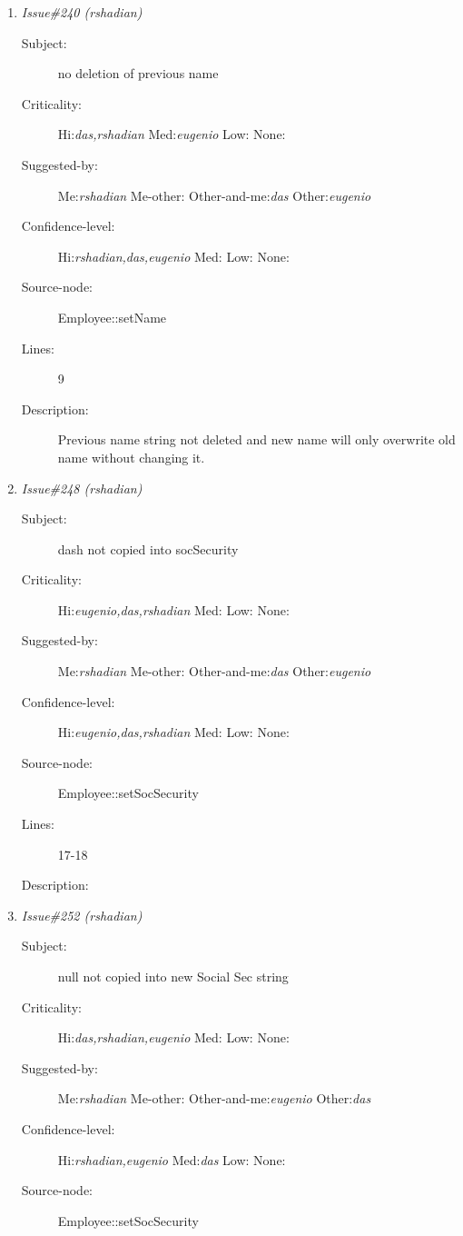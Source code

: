 \begin{enumerate}
\begin{description}
\item [Lines:] 7

\item [Description:] no allocation for null character at end of
string
\end{description}
\item {\it Issue\#240 (rshadian)}
\begin{description}
\item [Subject:] no deletion of previous name
\item [Criticality:] Hi:{\it das,rshadian} Med:{\it eugenio} Low:{\it } None:{\it }
\item [Suggested-by:] Me:{\it rshadian} Me-other:{\it } Other-and-me:{\it das} Other:{\it eugenio}
\item [Confidence-level:] Hi:{\it rshadian,das,eugenio} Med:{\it } Low:{\it } None:{\it }
\item [Source-node:] Employee::setName

\item [Lines:] 9

\item [Description:] Previous name string not deleted and new name
will only overwrite old name without changing it.
\end{description}
\item {\it Issue\#248 (rshadian)}
\begin{description}
\item [Subject:] dash not copied into socSecurity
\item [Criticality:] Hi:{\it eugenio,das,rshadian} Med:{\it } Low:{\it } None:{\it }
\item [Suggested-by:] Me:{\it rshadian} Me-other:{\it } Other-and-me:{\it das} Other:{\it eugenio}
\item [Confidence-level:] Hi:{\it eugenio,das,rshadian} Med:{\it } Low:{\it } None:{\it }
\item [Source-node:] Employee::setSocSecurity

\item [Lines:] 17-18

\item [Description:] 
\end{description}
\item {\it Issue\#252 (rshadian)}
\begin{description}
\item [Subject:] null not copied into new Social Sec string
\item [Criticality:] Hi:{\it das,rshadian,eugenio} Med:{\it } Low:{\it } None:{\it }
\item [Suggested-by:] Me:{\it rshadian} Me-other:{\it } Other-and-me:{\it eugenio} Other:{\it das}
\item [Confidence-level:] Hi:{\it rshadian,eugenio} Med:{\it das} Low:{\it } None:{\it }
\item [Source-node:] Employee::setSocSecurity


\end{description}
\end{enumerate}

